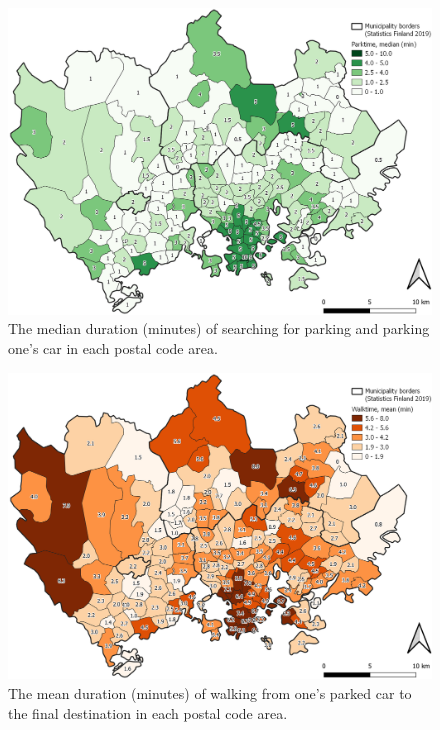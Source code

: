\begin{figure}[H]%
    \centering
    \includegraphics[width=\textwidth]{images/thesis_postalvis_parkmedian.png}
    \caption[Parktime, median, in the reseach area]{The median duration (minutes) of searching for parking and parking one's car in each postal code area.}%
    \label{fig:postalvis_parkmedian}%
\end{figure}

\begin{figure}[H]%
    \centering
    \includegraphics[width=\textwidth]{images/thesis_postalvis_walkmean.png}
    \caption[Walktime, mean, in the research area]{The mean duration (minutes) of walking from one's parked car to the final destination in each postal code area.}%
    \label{fig:postalvis_walkmean}%
\end{figure}

